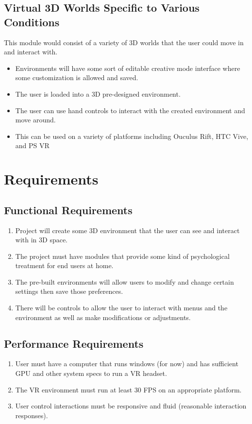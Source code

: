 \documentclass[a4paper,10pt]{article}
\begin{document}
	\subsection{Virtual 3D Worlds Specific to Various Conditions}
	This module would consist of a variety of 3D worlds that the user could move in and interact with. 
	\begin{itemize}
		\item Environments will have some sort of editable creative mode interface where some customization is allowed and saved.
		\item The user is loaded into a 3D pre-designed environment.
		\item The user can use hand controls to interact with the created environment and move around. 
		\item This can be used on a variety of platforms including Ouculus Rift, HTC Vive, and PS VR
	\end{itemize}
	\pagebreak
	
	\section{Requirements}
	\subsection{Functional Requirements}
	\begin{enumerate}
		\item Project will create some 3D environment that the user can see and interact with in 3D space.
		\item The project must have modules that provide some kind of psychological treatment for end users at home.
		\item The pre-built environments will allow users to modify and change certain settings then save those preferences.
		\item There will be controls to allow the user to interact with menus and the environment as well as make modifications or adjustments.
	\end{enumerate}
	
	\subsection{Performance Requirements}
	\begin{enumerate}
		\item User must have a computer that runs windows (for now) and has sufficient GPU and other system specs to run a VR headset.
		\item The VR environment must run at least 30 FPS on an appropriate platform.
		\item User control interactions must be responsive and fluid (reasonable interaction responses).
	\end{enumerate}
\end{document}
